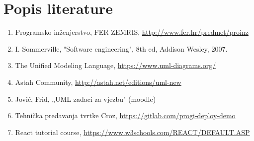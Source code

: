 \chapter*{Popis literature}
	
		
		\begin{enumerate}
			
			
			\item  Programsko inženjerstvo, FER ZEMRIS, \url{http://www.fer.hr/predmet/proinz}
			
			\item  I. Sommerville, "Software engineering", 8th ed, Addison Wesley, 2007.
			
			\item  The Unified Modeling Language, \url{https://www.uml-diagrams.org/}
			
			\item  Astah Community, \url{http://astah.net/editions/uml-new}
			
			\item Jović, Frid, „UML zadaci za vjezbu" (moodle)
			
			\item Tehnička predavanja tvrtke Croz, \url{https://gitlab.com/progi-deploy-demo}
			
			\item React tutorial course, \url{https://www.w3schools.com/REACT/DEFAULT.ASP}
			
		\end{enumerate}
		
		 